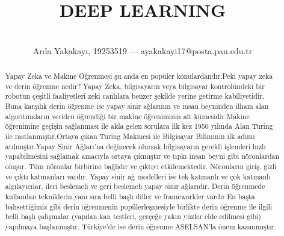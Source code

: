 \documentclass{IEEEtran}
\begin{document}

\title{DEEP LEARNING}


\author{\\Arda Yakakayı, 19253519 --- ayakakayi17@posta.pau.edu.tr}



\maketitle


    \begin{abstract}
        
            Yapay Zeka ve Makine Öğrenmesi şu anda en popüler konulardandır.Peki yapay zeka ve derin öğrenme nedir? Yapay Zeka, bilgisayarın veya bilgisayar kontrolündeki bir robotun çeşitli faaliyetleri zeki canlılara benzer şekilde yerine getirme kabiliyetidir. Buna karşılık derin öğrenme ise yapay sinir ağlarının ve insan beyninden ilham alan algoritmaların veriden öğrendiği bir makine öğreniminin alt kümesidir.Makine öğrenimine geçişin sağlanması ile akla gelen sorulara ilk kez 1950 yılında Alan Turing ile rastlanmıştır.Ortaya çıkan Turing Makinesi ile Bilgisayar Biliminin ilk adımı atılmıştır.Yapay Sinir Ağları'na değinecek olursak bilgisayarın gerekli işlemleri hızlı yapabilmesini sağlamak amacıyla ortaya çıkmıştır ve tıpkı insan beyni gibi nöronlardan oluşur. Tüm nöronlar birbirine bağlıdır ve çıktıyı etkilemektedir. Nöronların giriş, gizli ve çıktı katmanları vardır. Yapay sinir ağ modelleri ise tek katmanlı ve çok katmanlı algılayıcılar, ileri beslemeli ve geri beslemeli yapay sinir ağlarıdır. Derin öğrenmede kullanılan tekniklerin yanı sıra belli başlı diller ve frameworkler vardır.En başta bahsettiğimiz gibi derin öğrenmenin popülerleşmesiyle birlikte derin öğrenme ile ilgili belli başlı çalışmalar (yapılan kan testleri, gerçeğe yakın yüzler elde edilmesi gibi) yapılmaya başlanmıştır. Türkiye'de ise derin öğrenme ASELSAN'la önem kazanmıştır.
    \end{abstract}
    \vspace{15pt}
\end{document}
